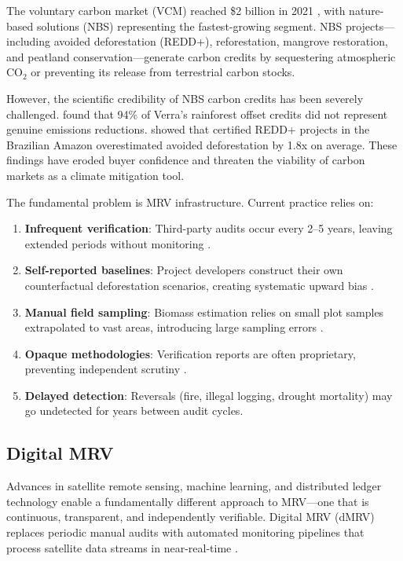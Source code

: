 \documentclass[11pt,a4paper]{article}
\begin{document}
The voluntary carbon market (VCM) reached \$2 billion in 2021
\citep{foresttrends2022}, with nature-based solutions (NBS) representing
the fastest-growing segment. NBS projects---including avoided
deforestation (REDD+), reforestation, mangrove restoration, and peatland
conservation---generate carbon credits by sequestering atmospheric CO$_2$
or preventing its release from terrestrial carbon stocks.

However, the scientific credibility of NBS carbon credits has been
severely challenged. \citet{west2023action} found that 94\% of Verra's
rainforest offset credits did not represent genuine emissions reductions.
\citet{guizar2022carbon} showed that certified REDD+ projects in the
Brazilian Amazon overestimated avoided deforestation by 1.8x on average.
These findings have eroded buyer confidence and threaten the viability of
carbon markets as a climate mitigation tool.

The fundamental problem is MRV infrastructure. Current practice relies
on:

\begin{enumerate}[label=(\roman*)]
  \item \textbf{Infrequent verification}: Third-party audits occur every
    2--5 years, leaving extended periods without monitoring
    \citep{schneider2019double}.
  \item \textbf{Self-reported baselines}: Project developers construct
    their own counterfactual deforestation scenarios, creating systematic
    upward bias \citep{west2023action}.
  \item \textbf{Manual field sampling}: Biomass estimation relies on
    small plot samples extrapolated to vast areas, introducing large
    sampling errors \citep{chave2014improved}.
  \item \textbf{Opaque methodologies}: Verification reports are often
    proprietary, preventing independent scrutiny \citep{badgley2022}.
  \item \textbf{Delayed detection}: Reversals (fire, illegal logging,
    drought mortality) may go undetected for years between audit cycles.
\end{enumerate}

\subsection{Digital MRV}

Advances in satellite remote sensing, machine learning, and distributed
ledger technology enable a fundamentally different approach to MRV---one
that is continuous, transparent, and independently verifiable. Digital
MRV (dMRV) replaces periodic manual audits with automated monitoring
pipelines that process satellite data streams in near-real-time
\citep{fuss2020moving}.
\end{document}

